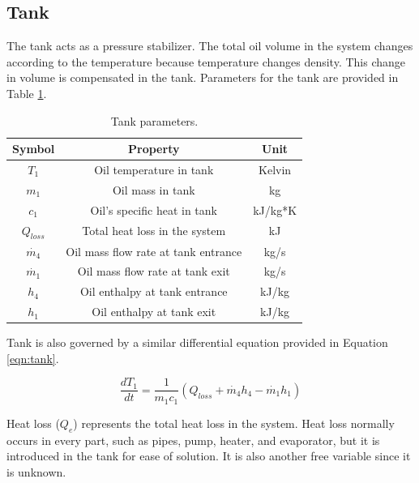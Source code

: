\subsection{Tank}
The tank acts as a pressure stabilizer. The total oil volume in the system changes according to the temperature because temperature changes density. This change in volume is compensated in the tank. Parameters for the tank are provided in Table \ref{tab:tank}.

\begin{table}[h]
    \centering
    \caption{Tank parameters.}
    \label{tab:tank}
    \begin{tabular}{|c|c|c|}
        \hline
        \textbf{Symbol} & \textbf{Property}                         & \textbf{Unit} \\
        \hline
        $T_{1}$         & Oil temperature in tank             & Kelvin \\
        $m_{1}$         & Oil mass in tank                    & kg \\
        $c_{1}$         & Oil's specific heat in tank         & kJ/kg*K \\
        $Q_{loss}$      & Total heat loss in the system       & kJ \\
        $\dot{m_{4}}$   & Oil mass flow rate at tank entrance & kg/s \\
        $\dot{m_{1}}$   & Oil mass flow rate at tank exit     & kg/s \\
        $h_{4}$         & Oil enthalpy at tank entrance       & kJ/kg \\
        $h_{1}$         & Oil enthalpy at tank exit           & kJ/kg \\
        \hline
    \end{tabular}
\end{table}

Tank is also governed by a similar differential equation provided in Equation \ref{eqn:tank}. 

\begin{equation}
    \label{eqn:tank}
    \frac{dT_{1}}{dt} = \frac{1}{m_{1}c_{1}}(Q_{loss} + \dot{m_{4}}h_{4} - \dot{m_{1}}h_{1})
\end{equation}

Heat loss ($Q_{e}$) represents the total heat loss in the system. Heat loss normally occurs in every part, such as pipes, pump, heater, and evaporator, but it is introduced in the tank for ease of solution. It is also another free variable since it is unknown. 

